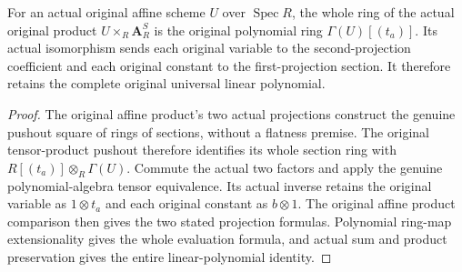 \begin{lemma}
\label{lem:kn-nadel-bertini-polynomial-product}
\leanok
{}
For an actual original affine scheme $U$ over $\operatorname{Spec}R$, the
whole ring of the actual original product $U\times_R\mathbf A^S_R$
is the original polynomial ring $\Gamma(U)[(t_a)]$. Its actual isomorphism
sends each original variable to the second-projection coefficient and each
original constant to the first-projection section. It therefore retains
the complete original universal linear polynomial.
\end{lemma}
\begin{proof}
The original affine product's two actual projections construct the genuine
pushout square of rings of sections, without a flatness premise. The
original tensor-product pushout therefore identifies its whole section
ring with $R[(t_a)]\otimes_R\Gamma(U)$. Commute the actual two factors
and apply the genuine polynomial-algebra tensor equivalence. Its actual
inverse retains the original variable as $1\otimes t_a$ and each original
constant as $b\otimes1$. The original affine product comparison then gives
the two stated projection formulas. Polynomial ring-map extensionality
gives the whole evaluation formula, and actual sum and product preservation
gives the entire linear-polynomial identity.
\end{proof}

